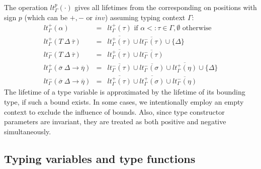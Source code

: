 \documentclass[11pt]{article}
\newcommand{\ap}{~}
\begin{document}
    The operation $lt_\Gamma^p(\cdot)$ gives all lifetimes from the corresponding on positions with sign $p$ (which can be $+, -$ or $inv$) assuming typing context $\Gamma$:
    \[
        \begin{array}{lll}
            lt_\Gamma^+(\alpha)                                       & = & lt_\Gamma^+(\tau) \text{ if } \alpha <: \tau \in \Gamma, \emptyset \text{ otherwise}                                     \\ %
            lt_\Gamma^+(T\ap\Delta\ap\overline{\tau})                 & = & \overline{lt_\Gamma^+(\tau)} \cup \overline{lt_\Gamma^-(\tau)} \cup \{\Delta\}                                           \\
            lt_\Gamma^-(T\ap\Delta\ap\overline{\tau})                 & = & \overline{lt_\Gamma^+(\tau)} \cup \overline{lt_\Gamma^-(\tau)}                                                           \\
            lt_\Gamma^{+}(\overline{\sigma}~\Delta\to\overline{\eta}) & = & \overline{lt_\Gamma^{-}(\tau)} \cup \overline{lt_\Gamma^{-}(\sigma)} \cup \overline{lt_\Gamma^{+}(\eta)} \cup \{\Delta\} \\
            lt_\Gamma^{-}(\overline{\sigma}~\Delta\to\overline{\eta}) & = & \overline{lt_\Gamma^{+}(\tau)} \cup \overline{lt_\Gamma^{+}(\sigma)} \cup \overline{lt_\Gamma^{-}(\eta)}
        \end{array}
    \]
    The lifetime of a type variable is approximated by the lifetime of its bounding type, if such a bound exists.
    In some cases, we intentionally employ an empty context to exclude the influence of bounds.
    Also, since type constructor parameters are invariant, they are treated as both positive and negative simultaneously.

    \subsection{Typing variables and type functions}
\end{document}
